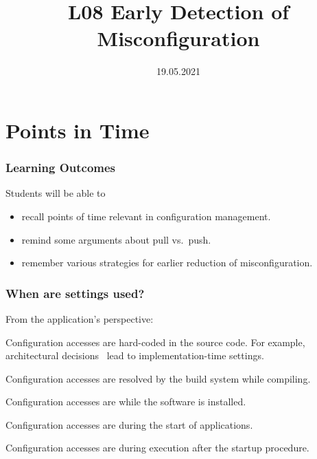 

\title{L08 Early Detection of Misconfiguration}
\date{19.05.2021}



\section{Points in Time}

\begin{frame}
	\frametitle{Learning Outcomes}
	Students will be able to
	\begin{itemize}
	\item recall points of time relevant in configuration management.
	\item remind some arguments about pull vs.\ push.
	\item remember various strategies for earlier reduction of misconfiguration.
	\end{itemize}
\end{frame}

\begin{frame}
\frametitle{When are settings used?}
	From the application's perspective:
	\vspace{1em}

	\begin{description}[<+-| alert@+>]
	\item[Implementation-time:] Configuration accesses 
	are hard-coded in the sou\-rce code.
	For example, architectural decisions~\cite{zdun2007patterns} lead to impl\-ementation-time settings.

	\item[Compile-time:] Configuration accesses 
	are resolved by the build system while compiling.

	\item[Deployment-time:] Configuration accesses 
	are while the software is installed.

	\item[Load-time:] Configuration accesses 
	are during the start of applications.

	\item[Run-time:] Configuration accesses 
	are during execution after the startup procedure.
	\end{description}
\end{frame}

